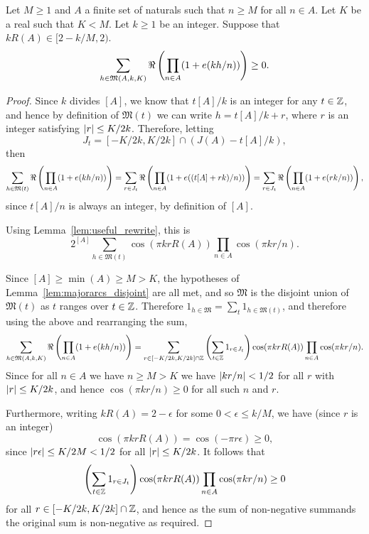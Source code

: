 \begin{lemma}\label{lem:majorarcs}
  \leanok
Let $M\geq 1$ and $A$ a finite set of naturals such that $n\geq M$ for all $n\in A$. Let $K$ be a real such that $K<M$. Let $k\geq 1$ be an integer. Suppose that $kR(A) \in [2-k/M,2)$.
\[\sum_{h\in \mathfrak{M}(A,k,K)}\Re\left( \prod_{n\in A}(1+e(kh/n))\right) \geq 0.\]
\end{lemma}
\begin{proof}
  \leanok
{}
Since $k$ divides $[A]$, we know that $t[A]/k$ is an integer for any $t\in \mathbb{Z}$, and hence by definition of $\mathfrak{M}(t)$ we can write $h=t[A]/k+r$, where $r$ is an integer satisfying $\left\lvert r\right\rvert\leq K/2k$. Therefore, letting
\[J_t =[-K/2k,K/2k]\cap (J(A)-t[A]/k),\]
then
\[\sum_{h\in \mathfrak{M}(t)}\Re\left( \prod_{n\in A}(1+e(kh/n))\right)=\sum_{r\in J_t}\Re\left( \prod_{n\in A}(1+e((t[A]+rk)/n))\right)=\sum_{r\in J_t}\Re\left( \prod_{n\in A}(1+e(rk/n))\right),\]
since $t[A]/n$ is always an integer, by definition of $[A]$.

Using Lemma~\ref{lem:useful_rewrite}, this is
\[2^{[A]}\sum_{h\in \mathfrak{M}(t)}\cos(\pi krR(A))\prod_{n\in A}\cos(\pi kr/n).\]


Since $[A]\geq \min(A)\geq M>K$, the hypotheses of Lemma~\ref{lem:majorarcs_disjoint} are all met, and so $\mathfrak{M}$ is the disjoint union of $\mathfrak{M}(t)$ as $t$ ranges over $t\in \mathbb{Z}$. Therefore $1_{h\in\mathfrak{M}}=\sum_t 1_{h\in \mathfrak{M}(t)}$, and therefore using the above and rearranging the sum,
\[\sum_{h\in \mathfrak{M}(A,k,K)}\Re\left( \prod_{n\in A}(1+e(kh/n))\right)
=\sum_{r\in [-K/2k,K/2k]\cap\mathbb{Z}}\left( \sum_{t\in \mathbb{Z}}1_{r\in J_t}\right)\cos(\pi krR(A))\prod_{n\in A}\cos(\pi kr/n).\]
Since for all $n\in A$ we have $n\geq M>K$ we have $\left\lvert kr/n\right\rvert< 1/2$ for all $r$ with $\left\lvert r\right\rvert\leq K/2k$, and hence $\cos(\pi kr/n)\geq 0$ for all such $n$ and $r$.

Furthermore, writing $kR(A)=2-\epsilon$ for some $0<\epsilon\leq k/M$, we have (since $r$ is an integer)
\[\cos(\pi kr R(A)) = \cos(-\pi r\epsilon)\geq 0,\]
since $\left\lvert r\epsilon\right\rvert\leq K/2M<1/2$ for all $\left\lvert r\right\rvert\leq K/2k$. It follows that
\[\left( \sum_{t\in \mathbb{Z}}1_{r\in J_t}\right)\cos(\pi krR(A))\prod_{n\in A}\cos(\pi kr/n)\geq 0\]
for all $r\in [-K/2k,K/2k]\cap \mathbb{Z}$, and hence as the sum of non-negative summands the original sum is non-negative as required.
\end{proof}

